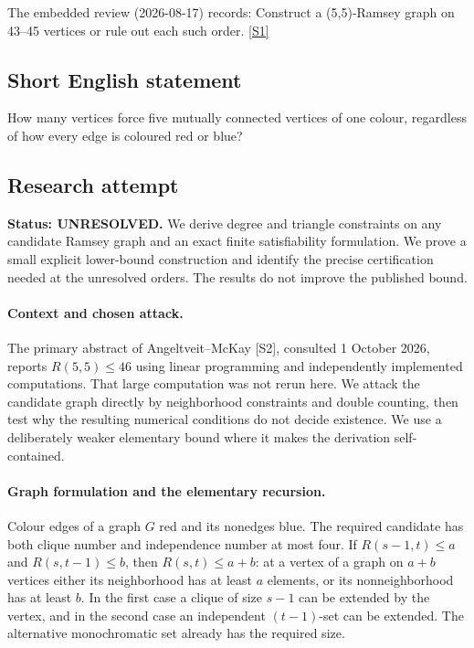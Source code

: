 \documentclass[11pt,a4paper]{article}
\newcommand{\sref}[2]{\hyperlink{source:#1:#2}{[S#2]}}
\begin{document}
The embedded review (2026-08-17) records: Construct a (5,5)-Ramsey graph on 43--45 vertices or rule out each such order. \sref{statement}{1}

\subsection{Short English statement}

How many vertices force five mutually connected vertices of one colour, regardless of how every edge is coloured red or blue?

\subsection{Research attempt}
\textbf{Status: UNRESOLVED.} We derive degree and triangle constraints on any candidate Ramsey graph and an exact finite satisfiability formulation. We prove a small explicit lower-bound construction and identify the precise certification needed at the unresolved orders. The results do not improve the published bound.

\paragraph{Context and chosen attack.}
The primary abstract of Angeltveit--McKay [S2], consulted 1 October 2026, reports $R(5,5)\le46$ using linear programming and independently implemented computations. That large computation was not rerun here. We attack the candidate graph directly by neighborhood constraints and double counting, then test why the resulting numerical conditions do not decide existence. We use a deliberately weaker elementary bound where it makes the derivation self-contained.

\paragraph{Graph formulation and the elementary recursion.}
Colour edges of a graph $G$ red and its nonedges blue. The required candidate has both clique number and independence number at most four. If $R(s-1,t)\le a$ and $R(s,t-1)\le b$, then $R(s,t)\le a+b$: at a vertex of a graph on $a+b$ vertices either its neighborhood has at least $a$ elements, or its nonneighborhood has at least $b$. In the first case a clique of size $s-1$ can be extended by the vertex, and in the second case an independent $(t-1)$-set can be extended. The alternative monochromatic set already has the required size.
\end{document}
